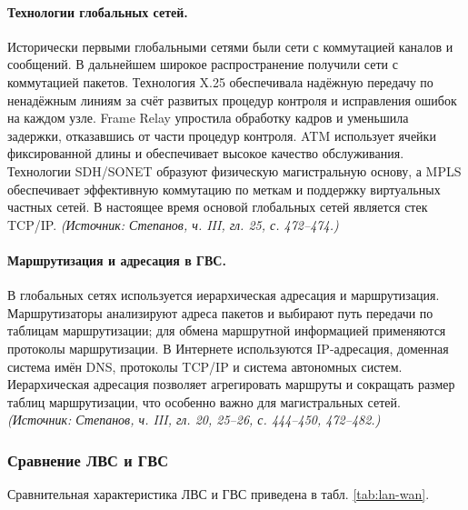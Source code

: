 \documentclass[a4paper,12pt]{article}
\begin{document}
\paragraph{Технологии глобальных сетей.}
Исторически первыми глобальными сетями были сети с коммутацией каналов и сообщений. В дальнейшем широкое распространение получили сети с коммутацией пакетов. Технология X.25 обеспечивала надёжную передачу по ненадёжным линиям за счёт развитых процедур контроля и исправления ошибок на каждом узле. Frame Relay упростила обработку кадров и уменьшила задержки, отказавшись от части процедур контроля. ATM использует ячейки фиксированной длины и обеспечивает высокое качество обслуживания. Технологии SDH/SONET образуют физическую магистральную основу, а MPLS обеспечивает эффективную коммутацию по меткам и поддержку виртуальных частных сетей. В настоящее время основой глобальных сетей является стек TCP/IP.
\textit{(Источник: Степанов, ч. III, гл. 25, с. 472–474.)}

\paragraph{Маршрутизация и адресация в ГВС.}
В глобальных сетях используется иерархическая адресация и маршрутизация. Маршрутизаторы анализируют адреса пакетов и выбирают путь передачи по таблицам маршрутизации; для обмена маршрутной информацией применяются протоколы маршрутизации. В Интернете используются IP-адресация, доменная система имён DNS, протоколы TCP/IP и система автономных систем. Иерархическая адресация позволяет агрегировать маршруты и сокращать размер таблиц маршрутизации, что особенно важно для магистральных сетей.
\textit{(Источник: Степанов, ч. III, гл. 20, 25–26, с. 444–450, 472–482.)}

\subsubsection{Сравнение ЛВС и ГВС}

Сравнительная характеристика ЛВС и ГВС приведена в табл. \ref{tab:lan-wan}.
\end{document}
